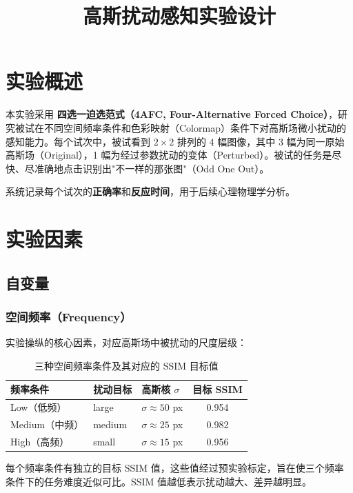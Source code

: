 \documentclass{article}
\title{高斯扰动感知实验设计}
\begin{document}
\maketitle

\section{实验概述}

本实验采用 \textbf{四选一迫选范式（4AFC, Four-Alternative Forced Choice）}，研究被试在不同空间频率条件和色彩映射（Colormap）条件下对高斯场微小扰动的感知能力。每个试次中，被试看到 $2 \times 2$ 排列的 4 幅图像，其中 3 幅为同一原始高斯场（Original），1 幅为经过参数扰动的变体（Perturbed）。被试的任务是尽快、尽准确地点击识别出"不一样的那张图"（Odd One Out）。

系统记录每个试次的\textbf{正确率}和\textbf{反应时间}，用于后续心理物理学分析。

\section{实验因素}

\subsection{自变量}

\subsubsection{空间频率（Frequency）}
实验操纵的核心因素，对应高斯场中被扰动的尺度层级：

\begin{table}[H]
\centering
\begin{tabular}{lllc}
\toprule
频率条件 & 扰动目标 & 高斯核 $\sigma$ & 目标 SSIM \\
\midrule
Low（低频）   & large  & $\sigma \approx 50$ px & 0.954 \\
Medium（中频）& medium & $\sigma \approx 25$ px & 0.982 \\
High（高频）  & small  & $\sigma \approx 15$ px & 0.956 \\
\bottomrule
\end{tabular}
\caption{三种空间频率条件及其对应的 SSIM 目标值}
\end{table}

每个频率条件有独立的目标 SSIM 值，这些值经过预实验标定，旨在使三个频率条件下的任务难度近似可比。SSIM 值越低表示扰动越大、差异越明显。
\end{document}
